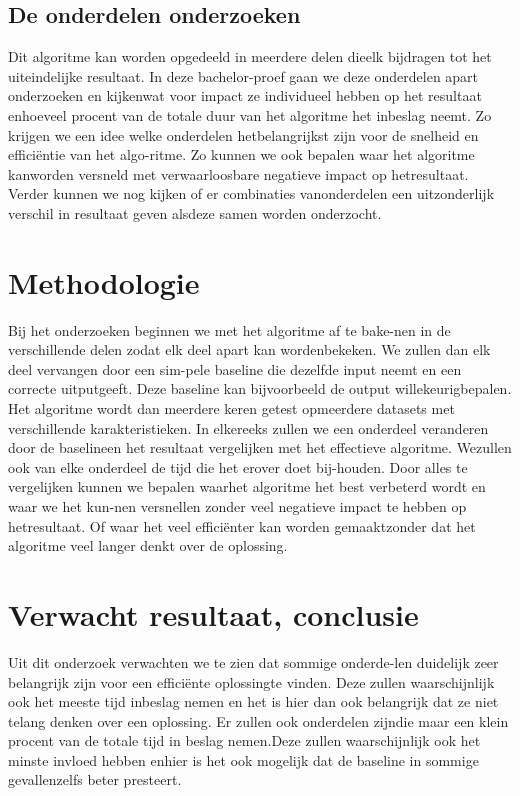\subsection{De onderdelen onderzoeken}
Dit algoritme kan worden opgedeeld in meerdere delen dieelk bijdragen tot het uiteindelijke resultaat. In deze bachelor-proef gaan we deze onderdelen apart onderzoeken en kijkenwat voor impact ze individueel hebben op het resultaat enhoeveel procent van de totale duur van het algoritme het inbeslag neemt. Zo krijgen we een idee welke onderdelen hetbelangrijkst zijn voor de snelheid en efficiëntie van het algo-ritme.  Zo kunnen we ook bepalen waar het algoritme kanworden versneld met verwaarloosbare negatieve impact op hetresultaat. Verder kunnen we nog kijken of er combinaties vanonderdelen een uitzonderlijk verschil in resultaat geven alsdeze samen worden onderzocht.

\section{Methodologie}%
\label{sec:methodologie}
Bij het onderzoeken beginnen we met het algoritme af te bake-nen in de verschillende delen zodat elk deel apart kan wordenbekeken.  We zullen dan elk deel vervangen door een sim-pele baseline die dezelfde input neemt en een correcte uitputgeeft. Deze baseline kan bijvoorbeeld de output willekeurigbepalen. Het algoritme wordt dan meerdere keren getest opmeerdere datasets met verschillende karakteristieken. In elkereeks zullen we een onderdeel veranderen door de baselineen het resultaat vergelijken met het effectieve algoritme. Wezullen ook van elke onderdeel de tijd die het erover doet bij-houden.  Door alles te vergelijken kunnen we bepalen waarhet algoritme het best verbeterd wordt en waar we het kun-nen versnellen zonder veel negatieve impact te hebben op hetresultaat.  Of waar het veel efficiënter kan worden gemaaktzonder dat het algoritme veel langer denkt over de oplossing.

\section{Verwacht resultaat, conclusie}%
\label{sec:verwachte_resultaten}

Uit dit onderzoek verwachten we te zien dat sommige onderde-len duidelijk zeer belangrijk zijn voor een efficiënte oplossingte vinden. Deze zullen waarschijnlijk ook het meeste tijd inbeslag nemen en het is hier dan ook belangrijk dat ze niet telang denken over een oplossing. Er zullen ook onderdelen zijndie maar een klein procent van de totale tijd in beslag nemen.Deze zullen waarschijnlijk ook het minste invloed hebben enhier is het ook mogelijk dat de baseline in sommige gevallenzelfs beter presteert.